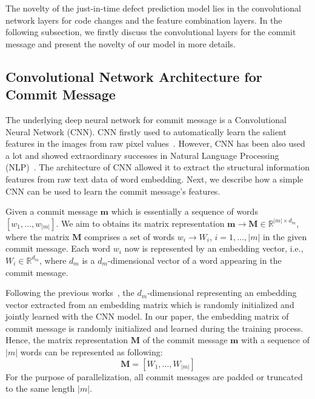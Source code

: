 The novelty of the just-in-time defect prediction model lies in the convolutional network layers for code changes and the feature combination layers. In the following subsection, we firstly discuss the convolutional layers for the commit message and present the novelty of our model in more details. 

\subsection{Convolutional Network Architecture for Commit Message}
\label{sec:cnn_msg}
The underlying deep neural network for commit message is a Convolutional Neural Network (CNN). CNN firstly used to automatically learn the salient features in the images from raw pixel values~\cite{krizhevsky2012imagenet}. However, CNN has been also used a lot and showed extraordinary successes in Natural Language Processing (NLP)~\cite{kim2014convolutional, dos2014deep, kalchbrenner2014convolutional, zhang2015character, johnson2014effective}. The architecture of CNN allowed it to extract the structural information features from raw text data of word embedding. Next, we describe how a simple CNN can be used to learn the commit message's features.

Given a commit message $\textbf{m}$ which is essentially a sequence of words $[w_1, \dots, w_{|m|}]$. We aim to obtains its matrix representation $\textbf{m} \rightarrow \textbf{M} \in \mathbb{R}^{|m| \times d_m}$, where the matrix $\textbf{M}$ comprises a set of words $w_i \rightarrow W_i$, $i = 1, \dots, |m|$ in the given commit message. Each word $w_i$ now is represented by an embedding vector, i.e., $W_i \in \mathbb{R}^{d_m}$, where $d_m$ is a $d_m$-dimensional vector of a word appearing in the commit message. 

Following the previous works~\cite{kim2014convolutional, zhang2015character}, the $d_m$-dimensional representing an embedding vector extracted from an embedding matrix which is randomly initialized and jointly learned with the CNN model. In our paper, the embedding matrix of commit message is randomly initialized and learned during the training process. Hence, the matrix representation $\textbf{M}$ of the commit message $\textbf{m}$ with a sequence of $|m|$ words can be represented as following:
\begin{equation}
\label{eq:representation_msg}
    \textbf{M} = [W_1, \dots, W_{|m|}]
\end{equation}
For the purpose of parallelization, all commit messages are padded or truncated to the same length $|m|$. 

